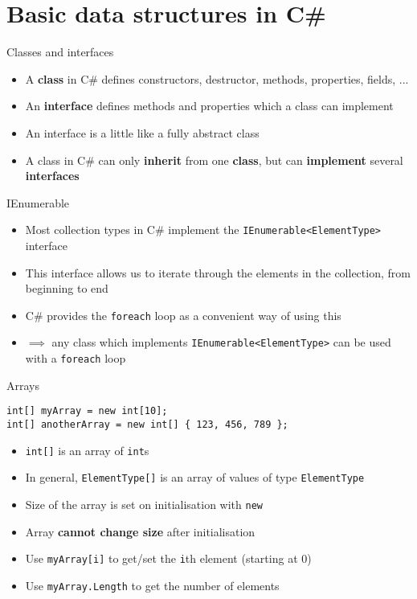 \part{Basic data structures in C\#}
\frame{\partpage}

\begin{frame}{Classes and interfaces}
    \begin{itemize}
        \pause\item A \textbf{class} in C\# defines constructors, destructor, methods, properties, fields, ...
        \pause\item An \textbf{interface} defines methods and properties which a class can implement
        \pause\item An interface is a little like a fully abstract class
        \pause\item A class in C\# can only \textbf{inherit} from one \textbf{class},
            but can \textbf{implement} several \textbf{interfaces}
    \end{itemize}
\end{frame}

\begin{frame}{IEnumerable}
    \begin{itemize}
		\pause\item Most collection types in C\# implement the \lstinline{IEnumerable<ElementType>} interface
		\pause\item This interface allows us to iterate through the elements in the collection, from beginning to end
		\pause\item C\# provides the \lstinline{foreach} loop as a convenient way of using this
		\pause\item $\implies$ any class which implements \lstinline{IEnumerable<ElementType>} can be used with a \lstinline{foreach} loop
    \end{itemize}
\end{frame}

\begin{frame}[fragile]{Arrays}
    \begin{lstlisting}
int[] myArray = new int[10];
int[] anotherArray = new int[] { 123, 456, 789 };
    \end{lstlisting}
    \begin{itemize}
		\pause\item \lstinline{int[]} is an array of \lstinline{int}s
		\pause\item In general, \lstinline{ElementType[]} is an array of values of type \lstinline{ElementType}
        \pause\item Size of the array is set on initialisation with \lstinline{new}
        \pause\item Array \textbf{cannot change size} after initialisation
        \pause\item Use \lstinline{myArray[i]} to get/set the \lstinline{i}th element (starting at 0)
        \pause\item Use \lstinline{myArray.Length} to get the number of elements
    \end{itemize}
\end{frame}

